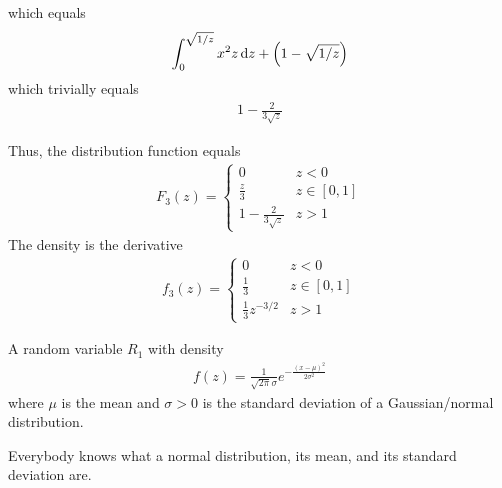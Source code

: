 \begin{solution}
\begin{enumerate}
        which equals
        \begin{align}
            \int_0^{\sqrt{1/z}} x^2 z \dd{z} + \qty(1 - \sqrt{1/z})
        \end{align}
        which trivially equals
        \begin{align}
            1 - \frac{2}{3\sqrt{z}}
        \end{align}
    \end{enumerate}
    Thus, the distribution function equals
    \begin{align}
        F_3(z) = \begin{cases}
            0 & z < 0\\
            \frac{z}{3} & z \in [0,1]\\
            1 - \frac{2}{3\sqrt{z}} & z > 1
        \end{cases}
    \end{align}
    The density is the derivative
    \begin{align}
        f_3(z) = \begin{cases}
            0 & z < 0\\
            \frac{1}{3} & z \in [0,1]\\
            \frac{1}{3}z^{-3/2} & z > 1
        \end{cases}
    \end{align}
\end{solution}

\begin{definition}
    A random variable $R_1$ with density
    \begin{align}
        f(z) = \frac{1}{\sqrt{2\pi}\sigma}e^{-\frac{(x-\mu)^2}{2\sigma^2}}
    \end{align}
    where $\mu$ is the mean and $\sigma > 0$ is the standard deviation of a Gaussian/normal distribution.
\end{definition}
Everybody knows what a normal distribution, its mean, and its standard deviation are.

